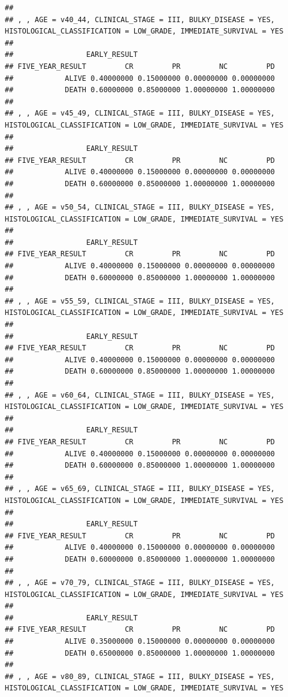 \documentclass[]{article}
\begin{document}
\begin{verbatim}
## 
## , , AGE = v40_44, CLINICAL_STAGE = III, BULKY_DISEASE = YES, HISTOLOGICAL_CLASSIFICATION = LOW_GRADE, IMMEDIATE_SURVIVAL = YES
## 
##                 EARLY_RESULT
## FIVE_YEAR_RESULT         CR         PR         NC         PD
##            ALIVE 0.40000000 0.15000000 0.00000000 0.00000000
##            DEATH 0.60000000 0.85000000 1.00000000 1.00000000
## 
## , , AGE = v45_49, CLINICAL_STAGE = III, BULKY_DISEASE = YES, HISTOLOGICAL_CLASSIFICATION = LOW_GRADE, IMMEDIATE_SURVIVAL = YES
## 
##                 EARLY_RESULT
## FIVE_YEAR_RESULT         CR         PR         NC         PD
##            ALIVE 0.40000000 0.15000000 0.00000000 0.00000000
##            DEATH 0.60000000 0.85000000 1.00000000 1.00000000
## 
## , , AGE = v50_54, CLINICAL_STAGE = III, BULKY_DISEASE = YES, HISTOLOGICAL_CLASSIFICATION = LOW_GRADE, IMMEDIATE_SURVIVAL = YES
## 
##                 EARLY_RESULT
## FIVE_YEAR_RESULT         CR         PR         NC         PD
##            ALIVE 0.40000000 0.15000000 0.00000000 0.00000000
##            DEATH 0.60000000 0.85000000 1.00000000 1.00000000
## 
## , , AGE = v55_59, CLINICAL_STAGE = III, BULKY_DISEASE = YES, HISTOLOGICAL_CLASSIFICATION = LOW_GRADE, IMMEDIATE_SURVIVAL = YES
## 
##                 EARLY_RESULT
## FIVE_YEAR_RESULT         CR         PR         NC         PD
##            ALIVE 0.40000000 0.15000000 0.00000000 0.00000000
##            DEATH 0.60000000 0.85000000 1.00000000 1.00000000
## 
## , , AGE = v60_64, CLINICAL_STAGE = III, BULKY_DISEASE = YES, HISTOLOGICAL_CLASSIFICATION = LOW_GRADE, IMMEDIATE_SURVIVAL = YES
## 
##                 EARLY_RESULT
## FIVE_YEAR_RESULT         CR         PR         NC         PD
##            ALIVE 0.40000000 0.15000000 0.00000000 0.00000000
##            DEATH 0.60000000 0.85000000 1.00000000 1.00000000
## 
## , , AGE = v65_69, CLINICAL_STAGE = III, BULKY_DISEASE = YES, HISTOLOGICAL_CLASSIFICATION = LOW_GRADE, IMMEDIATE_SURVIVAL = YES
## 
##                 EARLY_RESULT
## FIVE_YEAR_RESULT         CR         PR         NC         PD
##            ALIVE 0.40000000 0.15000000 0.00000000 0.00000000
##            DEATH 0.60000000 0.85000000 1.00000000 1.00000000
## 
## , , AGE = v70_79, CLINICAL_STAGE = III, BULKY_DISEASE = YES, HISTOLOGICAL_CLASSIFICATION = LOW_GRADE, IMMEDIATE_SURVIVAL = YES
## 
##                 EARLY_RESULT
## FIVE_YEAR_RESULT         CR         PR         NC         PD
##            ALIVE 0.35000000 0.15000000 0.00000000 0.00000000
##            DEATH 0.65000000 0.85000000 1.00000000 1.00000000
## 
## , , AGE = v80_89, CLINICAL_STAGE = III, BULKY_DISEASE = YES, HISTOLOGICAL_CLASSIFICATION = LOW_GRADE, IMMEDIATE_SURVIVAL = YES

\end{verbatim}
\end{document}
